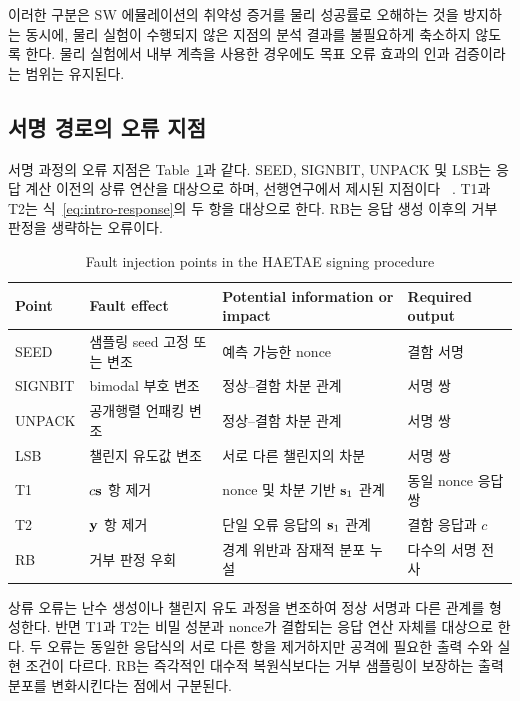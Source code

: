 이러한 구분은 SW 에뮬레이션의 취약성 증거를 물리 성공률로 오해하는
것을 방지하는 동시에, 물리 실험이 수행되지 않은 지점의 분석 결과를
불필요하게 축소하지 않도록 한다. 물리 실험에서 내부 계측을 사용한
경우에도 목표 오류 효과의 인과 검증이라는 범위는 유지된다.

\subsection{서명 경로의 오류 지점}

 서명 과정의 오류 지점은 Table~\ref{tab:fault-surface}과
같다. SEED, SIGNBIT, UNPACK 및 LSB는 응답 계산 이전의 상류
연산을 대상으로 하며, 선행연구에서 제시된 지점이다
~\cite{lee2026haetae}. T1과 T2는 식~\eqref{eq:intro-response}의
두 항을 대상으로 한다. RB는 응답 생성 이후의 거부 판정을 생략하는
오류이다.

\begin{table}[t]
\centering
\caption{Fault injection points in the HAETAE signing procedure}
\label{tab:fault-surface}
\small
\begin{tabularx}{0.96\textwidth}{@{}l X X l@{}}
\toprule
Point & Fault effect & Potential information or impact & Required output \\
\midrule
SEED & 샘플링 seed 고정 또는 변조 & 예측 가능한 nonce & 결함 서명 \\
SIGNBIT & bimodal 부호 변조 & 정상--결함 차분 관계 & 서명 쌍 \\
UNPACK & 공개행렬 언패킹 변조 & 정상--결함 차분 관계 & 서명 쌍 \\
LSB & 챌린지 유도값 변조 & 서로 다른 챌린지의 차분 & 서명 쌍 \\
T1 & $c\mathbf{s}$ 항 제거 & nonce 및 차분 기반 $\mathbf{s}_1$ 관계 & 동일 nonce 응답 쌍 \\
T2 & $\mathbf{y}$ 항 제거 & 단일 오류 응답의 $\mathbf{s}_1$ 관계 & 결함 응답과 $c$ \\
RB & 거부 판정 우회 & 경계 위반과 잠재적 분포 누설 & 다수의 서명 전사 \\
\bottomrule
\end{tabularx}
\end{table}

상류 오류는 난수 생성이나 챌린지 유도 과정을 변조하여 정상 서명과 다른
관계를 형성한다. 반면 T1과 T2는 비밀 성분과 nonce가 결합되는 응답
연산 자체를 대상으로 한다. 두 오류는 동일한 응답식의 서로 다른 항을
제거하지만 공격에 필요한 출력 수와 실현 조건이 다르다. RB는 즉각적인
대수적 복원식보다는 거부 샘플링이 보장하는 출력 분포를 변화시킨다는
점에서 구분된다.

